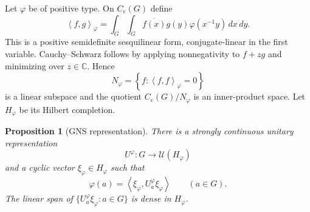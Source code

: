 \documentclass[11pt]{article}
\newtheorem{proposition}[theorem]{Proposition}
\theoremstyle{definition}
\theoremstyle{remark}
\newcommand{\C}{\mathbb C}
\newcommand{\Cc}{C_{\mathrm c}}
\newcommand{\set}[1]{\left\{#1\right\}}
\newcommand{\angles}[1]{\left\langle #1\right\rangle}
\begin{document}
Let $\varphi$ be of positive type.  On $\Cc(G)$ define
\begin{equation}
 \angles{f,g}_\varphi
 =\int_G\int_G\overline{f(x)}g(y)\varphi(x^{-1}y)\,dx\,dy.
 \label{eq:gns-form}
\end{equation}
This is a positive semidefinite sesquilinear form, conjugate-linear in the first
variable.  Cauchy--Schwarz follows by applying nonnegativity to
$f+zg$ and minimizing over $z\in\C$.  Hence
\[
 N_\varphi=\set{f:\angles{f,f}_\varphi=0}
\]
is a linear subspace and the quotient $\Cc(G)/N_\varphi$ is an inner-product space.
Let $H_\varphi$ be its Hilbert completion.

\begin{proposition}[GNS representation]
\label{prop:gns}
There is a strongly continuous unitary representation
\[
 U^\varphi:G\longrightarrow\mathcal U(H_\varphi)
\]
and a cyclic vector $\xi_\varphi\in H_\varphi$ such that
\begin{equation}
  \varphi(a)=\angles{\xi_\varphi,U^\varphi_a\xi_\varphi}
  \qquad(a\in G).
  \label{eq:gns-coefficient}
\end{equation}
The linear span of $\{U^\varphi_a\xi_\varphi:a\in G\}$ is dense in $H_\varphi$.
\end{proposition}
\end{document}
